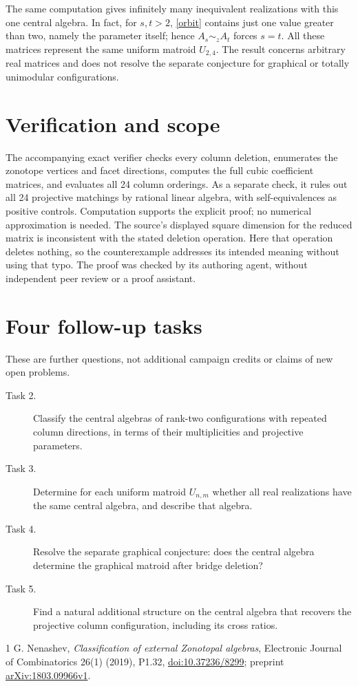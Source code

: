 \documentclass[11pt]{article}
\begin{document}
The same computation gives infinitely many inequivalent realizations with
this one central algebra. In fact, for $s,t>2$, \eqref{orbit} contains just
one value greater than two, namely the parameter itself; hence
$A_s\sim_z A_t$ forces $s=t$. All these matrices represent the same uniform
matroid $U_{2,4}$. The result concerns arbitrary real matrices and does not
resolve the separate conjecture for graphical or totally unimodular
configurations.

\section*{Verification and scope}
The accompanying exact verifier checks every column deletion, enumerates
the zonotope vertices and facet directions, computes the full cubic
coefficient matrices, and evaluates all 24 column orderings. As a separate
check, it rules out all 24 projective matchings by rational linear algebra,
with self-equivalences as positive controls. Computation supports the
explicit proof; no numerical approximation is needed. The source's
displayed square dimension for the reduced matrix is inconsistent with
the stated deletion operation. Here that operation deletes nothing, so
the counterexample addresses its intended meaning without using that typo.
The proof was checked by its authoring agent, without independent peer
review or a proof assistant.

\section*{Four follow-up tasks}
These are further questions, not additional campaign credits or claims of
new open problems.
\begin{description}
\item[Task 2.] Classify the central algebras of rank-two configurations
with repeated column directions, in terms of their multiplicities and
projective parameters.
\item[Task 3.] Determine for each uniform matroid $U_{n,m}$ whether all
real realizations have the same central algebra, and describe that algebra.
\item[Task 4.] Resolve the separate graphical conjecture: does the central
algebra determine the graphical matroid after bridge deletion?
\item[Task 5.] Find a natural additional structure on the central algebra
that recovers the projective column configuration, including its cross ratios.
\end{description}

\begin{thebibliography}{1}
 G. Nenashev, \emph{Classification of external Zonotopal algebras},
Electronic Journal of Combinatorics 26(1) (2019), P1.32,
\href{https://doi.org/10.37236/8299}{doi:10.37236/8299};
preprint \href{https://arxiv.org/abs/1803.09966}{arXiv:1803.09966v1}.
\end{thebibliography}
\end{document}
